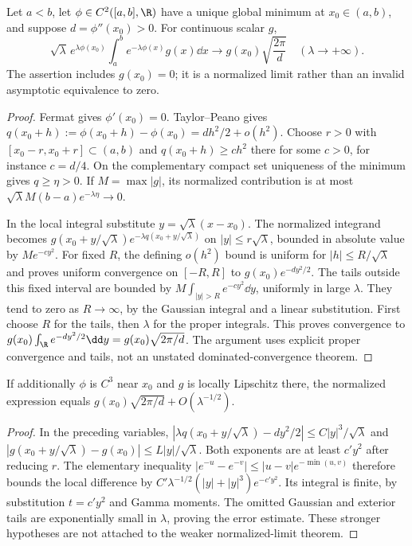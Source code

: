 \begin{theorem}
Let $a<b$, let $\phi\in C^2([a,b],\R)$ have a unique global minimum at
$x_0\in(a,b)$, and suppose $d=\phi''(x_0)>0$. For continuous scalar $g$,
\[
 \sqrt\lambda\,e^{\lambda\phi(x_0)}
 \int_a^b e^{-\lambda\phi(x)}g(x)\dd x
 \longrightarrow g(x_0)\sqrt{\frac{2\pi}{d}}
 \quad(\lambda\to+\infty).
\]
The assertion includes $g(x_0)=0$; it is a normalized limit rather than an
invalid asymptotic equivalence to zero.
\end{theorem}
\begin{proof}
Fermat gives $\phi'(x_0)=0$. Taylor--Peano gives
$q(x_0+h):=\phi(x_0+h)-\phi(x_0)=dh^2/2+o(h^2)$.
Choose $r>0$ with $[x_0-r,x_0+r]\subset(a,b)$ and
$q(x_0+h)\geq c h^2$ there for some $c>0$, for instance $c=d/4$.
On the complementary compact set uniqueness of the minimum gives
$q\geq\eta>0$. If $M=\max|g|$, its normalized contribution is at most
$\sqrt\lambda M(b-a)e^{-\lambda\eta}\to0$.

In the local integral substitute $y=\sqrt\lambda(x-x_0)$. The normalized
integrand becomes
$g(x_0+y/\sqrt\lambda)e^{-\lambda q(x_0+y/\sqrt\lambda)}$ on
$|y|\leq r\sqrt\lambda$, bounded in absolute value by $Me^{-cy^2}$.
For fixed $R$, the defining $o(h^2)$ bound is uniform for
$|h|\leq R/\sqrt\lambda$ and proves uniform convergence on $[-R,R]$ to
$g(x_0)e^{-dy^2/2}$. The tails outside this fixed interval are bounded by
$M\int_{|y|>R}e^{-cy^2}\dd y$, uniformly in large $\lambda$.
They tend to zero as $R\to\infty$, by the Gaussian integral and a linear
substitution. First choose $R$ for the tails, then $\lambda$ for the proper
integrals. This proves convergence to
$g(x_0)\int_\R e^{-dy^2/2}\dd y=g(x_0)\sqrt{2\pi/d}$.
The argument uses explicit proper convergence and tails, not an unstated
dominated-convergence theorem.
\end{proof}
\begin{corollary}
If additionally $\phi$ is $C^3$ near $x_0$ and $g$ is locally Lipschitz there,
the normalized expression equals
$g(x_0)\sqrt{2\pi/d}+O(\lambda^{-1/2})$.
\end{corollary}
\begin{proof}
In the preceding variables,
$|\lambda q(x_0+y/\sqrt\lambda)-dy^2/2|
 \leq C|y|^3/\sqrt\lambda$ and
$|g(x_0+y/\sqrt\lambda)-g(x_0)|\leq L|y|/\sqrt\lambda$.
Both exponents are at least $c'y^2$ after reducing $r$.
The elementary inequality $|e^{-u}-e^{-v}|\leq|u-v|e^{-\min(u,v)}$
therefore bounds the local difference by
$C'\lambda^{-1/2}(|y|+|y|^3)e^{-c'y^2}$.
Its integral is finite, by substitution $t=c'y^2$ and Gamma moments.
The omitted Gaussian and exterior tails are exponentially small in
$\lambda$, proving the error estimate. These stronger hypotheses are not
attached to the weaker normalized-limit theorem.
\end{proof}

